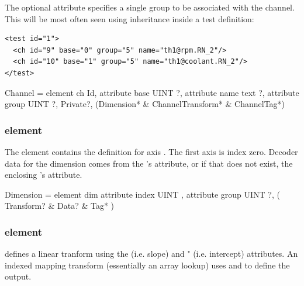 \documentclass{article}
\begin{document}
The optional  attribute specifies a single group to be
associated with the channel.  This will be most often seen using
inheritance inside a test definition:
\begin{lstlisting}[language=siexml]
<test id="1">
  <ch id="9" base="0" group="5" name="th1@rpm.RN_2"/>
  <ch id="10" base="1" group="5" name="th1@coolant.RN_2"/>
</test>
\end{lstlisting}


\begin{grammar}
Channel = element ch {
  Id,
  attribute base { UINT }?,
  attribute name { text }?,
  attribute group { UINT }?,
  Private?,
  (Dimension* & ChannelTransform* & ChannelTag*)
}
\end{grammar}

\subsubsection{ element}

The  element contains the definition for axis .
The first axis is index zero.  Decoder data for the dimension comes
from the 's  attribute, or if that does not exist,
the enclosing 's  attribute.

\begin{grammar}
Dimension = element dim {
  attribute index { UINT },
  attribute group { UINT }?,
  ( Transform? & Data? & Tag* )
}
\end{grammar}

\subsubsection{ element}

 defines a linear tranform using the  (i.e. slope)
and " (i.e. intercept) attributes.  An indexed mapping
transform (essentially an array lookup) uses  and
 to define the output.
\end{document}
